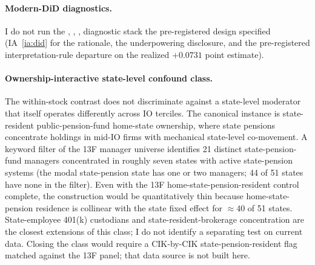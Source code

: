 \paragraph{Modern-DiD diagnostics.} I do not run the \citet{callawaySantanna2021}, \citet{sunAbraham2021}, \citet{goodmanBacon2021}, \citet{rambachanRoth2023} diagnostic stack the pre-registered design specified (IA~\ref{ia:did} for the rationale, the underpowering disclosure, and the pre-registered interpretation-rule departure on the realized $+0.0731$ point estimate).

\paragraph{Ownership-interactive state-level confound class.} The within-stock contrast does not discriminate against a state-level moderator that itself operates differently across IO terciles. The canonical instance is state-resident public-pension-fund home-state ownership, where state pensions concentrate holdings in mid-IO firms with mechanical state-level co-movement. A keyword filter of the 13F manager universe identifies 21 distinct state-pension-fund managers concentrated in roughly seven states with active state-pension systems (the modal state-pension state has one or two managers; 44 of 51 states have none in the filter). Even with the 13F home-state-pension-resident control complete, the construction would be quantitatively thin because home-state-pension residence is collinear with the state fixed effect for $\approx 40$ of 51 states. State-employee 401(k) custodians and state-resident-brokerage concentration are the closest extensions of this class; I do not identify a separating test on current data. Closing the class would require a CIK-by-CIK state-pension-resident flag matched against the 13F panel; that data source is not built here.
